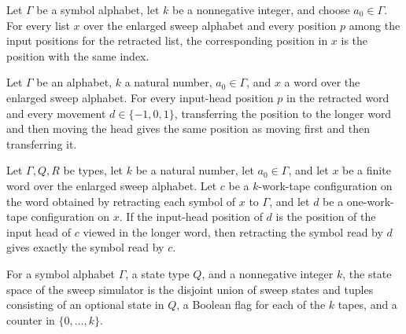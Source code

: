 \begin{definition}
\label{Turing.FinTM.dgPos}
\leanok
{}
Let $\Gamma$ be a symbol alphabet, let $k$ be a nonnegative integer, and choose $a_0 \in
\Gamma$. For every list $x$ over the enlarged sweep alphabet and every position $p$
among the input positions for the retracted list, the corresponding position in $x$ is
the position with the same index.
\end{definition}

\begin{lemma}
\label{Turing.FinTM.dgPos_move}
\leanok
{}
Let $\Gamma$ be an alphabet, $k$ a natural number, $a_0\in\Gamma$, and $x$ a word over
the enlarged sweep alphabet. For every input-head position $p$ in the retracted word and
every movement $d\in\{-1,0,1\}$, transferring the position to the longer word and then
moving the head gives the same position as moving first and then transferring it.
\end{lemma}

\begin{lemma}
\label{Turing.FinTM.dgInput_read}
\leanok
{}
Let $\Gamma,Q,R$ be types, let $k$ be a natural number, let $a_0\in\Gamma$, and let $x$
be a finite word over the enlarged sweep alphabet. Let $c$ be a $k$-work-tape
configuration on the word obtained by retracting each symbol of $x$ to $\Gamma$, and let
$d$ be a one-work-tape configuration on $x$. If the input-head position of $d$ is the
position of the input head of $c$ viewed in the longer word, then retracting the symbol
read by $d$ gives exactly the symbol read by $c$.
\end{lemma}

\begin{definition}
\label{Turing.FinTM.DGState}
\leanok
{}
For a symbol alphabet $\Gamma$, a state type $Q$, and a nonnegative integer $k$, the
state space of the sweep simulator is the disjoint union of sweep states and tuples
consisting of an optional state in $Q$, a Boolean flag for each of the $k$ tapes, and a
counter in $\{0,\ldots,k\}$.
\end{definition}

